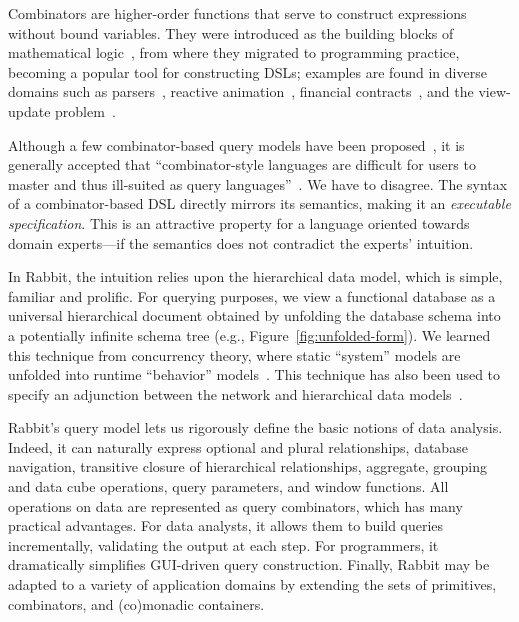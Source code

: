 Combinators are higher-order functions that serve to construct expressions
without bound variables.  They were introduced as the building blocks of
mathematical logic~\cite{Schoenfinkel1924, Curry1930}, from where they migrated
to programming practice, becoming a popular tool for constructing DSLs;
examples are found in diverse domains such as parsers~\cite{Wadler1985,
Hutton1996}, reactive animation~\cite{Elliott1997}, financial
contracts~\cite{Jones2000}, and the view-update problem~\cite{Foster2005}.

Although a few combinator-based query models have been
proposed~\cite{Buneman1979, Bossi1984, Batory1988, Erwig1991, Cherniack1996},
it is generally accepted that ``combinator-style languages are difficult for
users to master and thus ill-suited as query languages''~\cite{Cherniack1996}.
We have to disagree.  The syntax of a combinator-based DSL directly mirrors its
semantics, making it an \emph{executable specification}.  This is an attractive
property for a language oriented towards domain experts---if the semantics does
not contradict the experts' intuition.

In Rabbit, the intuition relies upon the hierarchical data model, which is
simple, familiar and prolific.  For querying purposes, we view a functional
database as a universal hierarchical document obtained by unfolding the
database schema into a potentially infinite schema tree (e.g.,
Figure~\ref{fig:unfolded-form}).  We learned this technique from concurrency
theory, where static ``system'' models are unfolded into runtime ``behavior''
models~\cite{Nielsen1994}.  This technique has also been used to specify an
adjunction between the network and hierarchical data
models~\cite{Cartmell1985}.

Rabbit's query model lets us rigorously define the basic notions of data
analysis.  Indeed, it can naturally express optional and plural relationships,
database navigation, transitive closure of hierarchical relationships,
aggregate, grouping and data cube operations, query parameters, and window
functions.  All operations on data are represented as query combinators, which
has many practical advantages.  For data analysts, it allows them to build
queries incrementally, validating the output at each step.  For programmers, it
dramatically simplifies GUI-driven query construction.  Finally, Rabbit may be
adapted to a variety of application domains by extending the sets of
primitives, combinators, and (co)monadic containers.

